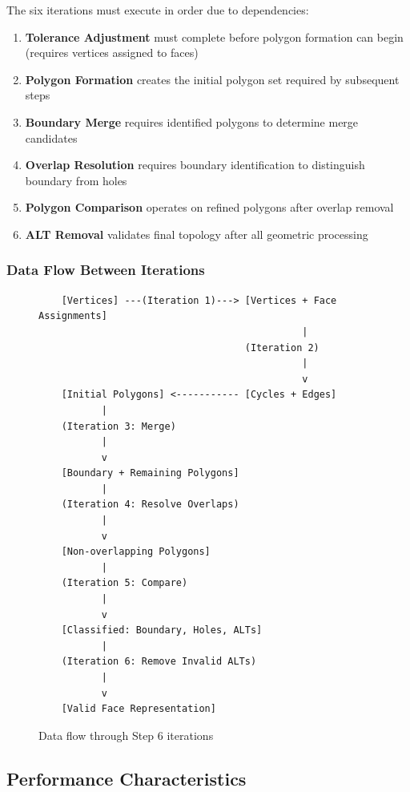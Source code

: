 The six iterations must execute in order due to dependencies:

\begin{enumerate}
    \item \textbf{Tolerance Adjustment} must complete before polygon formation can begin (requires vertices assigned to faces)
    \item \textbf{Polygon Formation} creates the initial polygon set required by subsequent steps
    \item \textbf{Boundary Merge} requires identified polygons to determine merge candidates
    \item \textbf{Overlap Resolution} requires boundary identification to distinguish boundary from holes
    \item \textbf{Polygon Comparison} operates on refined polygons after overlap removal
    \item \textbf{ALT Removal} validates final topology after all geometric processing
\end{enumerate}

\subsubsection{Data Flow Between Iterations}

\begin{figure}[h]
\centering
\begin{verbatim}
    [Vertices] ---(Iteration 1)---> [Vertices + Face Assignments]
                                              |
                                    (Iteration 2)
                                              |
                                              v
    [Initial Polygons] <----------- [Cycles + Edges]
           |
    (Iteration 3: Merge)
           |
           v
    [Boundary + Remaining Polygons]
           |
    (Iteration 4: Resolve Overlaps)
           |
           v
    [Non-overlapping Polygons]
           |
    (Iteration 5: Compare)
           |
           v
    [Classified: Boundary, Holes, ALTs]
           |
    (Iteration 6: Remove Invalid ALTs)
           |
           v
    [Valid Face Representation]
\end{verbatim}
\caption{Data flow through Step 6 iterations}
\end{figure}

\subsection{Performance Characteristics}

